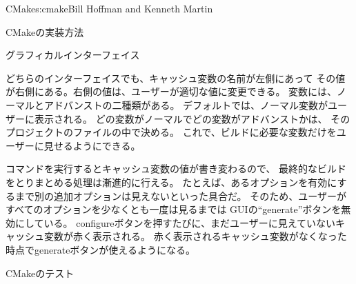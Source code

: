 \begin{aosachapter}{CMake}{s:cmake}{Bill Hoffman and Kenneth Martin}
\begin{aosasect1}{CMakeの実装方法}
\begin{aosasect2}{グラフィカルインターフェイス}


どちらのインターフェイスでも、キャッシュ変数の名前が左側にあって
その値が右側にある。右側の値は、ユーザーが適切な値に変更できる。
変数には、ノーマルとアドバンストの二種類がある。
デフォルトでは、ノーマル変数がユーザーに表示される。
どの変数がノーマルでどの変数がアドバンストかは、
そのプロジェクトのファイルの中で決める。
これで、ビルドに必要な変数だけをユーザーに見せるようにできる。

コマンドを実行するとキャッシュ変数の値が書き変わるので、
最終的なビルドをとりまとめる処理は漸進的に行える。
たとえば、あるオプションを有効にするまで別の追加オプションは見えないといった具合だ。
そのため、ユーザーがすべてのオプションを少なくとも一度は見るまでは
GUIの``generate''ボタンを無効にしている。
configureボタンを押すたびに、まだユーザーに見えていないキャッシュ変数が赤く表示される。
赤く表示されるキャッシュ変数がなくなった時点でgenerateボタンが使えるようになる。

\end{aosasect2}

\begin{aosasect2}{CMakeのテスト}


\end{aosasect2}
\end{aosasect1}
\end{aosachapter}
